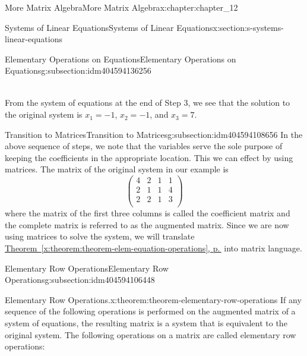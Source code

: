 \documentclass[twoside,10pt,]{book}
\newcommand{\xreffont}{\relax}
\numberwithin{equation}{section}
\begin{document}
\begin{chapterptx}{More Matrix Algebra}{}{More Matrix Algebra}{}{}{x:chapter:chapter_12}
\begin{sectionptx}{Systems of Linear Equations}{}{Systems of Linear Equations}{}{}{x:section:s-systems-linear-equations}
\begin{subsectionptx}{Elementary Operations on Equations}{}{Elementary Operations on Equations}{}{}{g:subsection:idm404594136256}
\begin{itemize}[label=\textbullet]
\begin{gather}
\end{gather}
%
\end{itemize}
%
\par
From the system of equations at the end of Step 3, we see that the solution to the original system is \(x_1=-1\), \(x_2= -1\), and \(x_3= 7\).%
\end{subsectionptx}
%
%
\typeout{************************************************}
\typeout{************************************************}
%
\begin{subsectionptx}{Transition to Matrices}{}{Transition to Matrices}{}{}{g:subsection:idm404594108656}
In the above sequence of steps, we note that the variables serve the sole purpose of keeping the coefficients in the appropriate location. This we can effect by using matrices. The matrix of the  original system in our example is%
\begin{equation*}
\left(
\begin{array}{ccc|c}
4 & 2 & 1 & 1 \\
2 & 1 & 1 & 4 \\
2 & 2 & 1 & 3 \\
\end{array}
\right)
\end{equation*}
where the matrix of the first three columns is called the coefficient matrix and the complete matrix is referred to as the augmented matrix. Since we are now using matrices to solve the system, we will translate \hyperref[x:theorem:theorem-elem-equation-operations]{Theorem~{\xreffont\ref{x:theorem:theorem-elem-equation-operations}}, p.\,\pageref{x:theorem:theorem-elem-equation-operations}} into matrix language.%
\end{subsectionptx}
%
%
\typeout{************************************************}
\typeout{************************************************}
%
\begin{subsectionptx}{Elementary Row Operations}{}{Elementary Row Operations}{}{}{g:subsection:idm404594106448}
\begin{theorem}{Elementary Row Operations.}{}{x:theorem:theorem-elementary-row-operations}%
%
If any sequence of the following operations is performed on the augmented matrix of a system of equations, the resulting matrix is a system that is equivalent to the original system. The following operations on a matrix are called elementary row operations:%
\begin{enumerate}[label=(\arabic*)]

\end{enumerate}
\end{theorem}
\end{subsectionptx}
\end{sectionptx}
\end{chapterptx}
\end{document}
